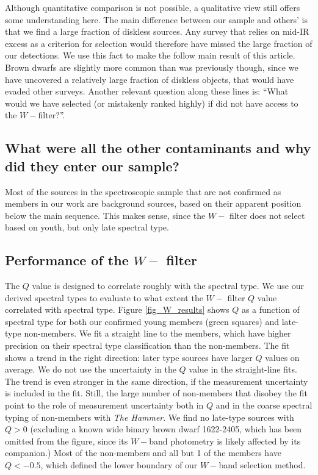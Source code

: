 \documentclass[12pt,preprint]{aastex}
\begin{document}
Although quantitative comparison is not possible, a qualitative view still offers some understanding here.  The main difference between our sample and others' is that we find a large fraction of diskless sources.  Any survey that relies on mid-IR excess as a criterion for selection would therefore have missed the large fraction of our detections.  We use this fact to make the follow main result of this article.  Brown dwarfs are slightly more common than was previously though, since we have uncovered a relatively large fraction of diskless objects, that would have evaded other surveys.  Another relevant question along these lines is: ``What would we have selected (or mistakenly ranked highly) if did not have access to the  $W-$filter?''.


\subsection{What were all the other contaminants and why did they enter our sample?}
Most of the sources in the spectroscopic sample that are not confirmed as members in our work are background sources, based on their apparent position below the main sequence.  This makes sense, since the $W-$ filter does not select based on youth, but only late spectral type.

\subsection{Performance of the $W-$ filter}

The $Q$ value is designed to correlate roughly with the spectral type.  We use our derived spectral types to evaluate to what extent the $W-$ filter $Q$ value correlated with spectral type.  Figure \ref{fig_W_results} shows $Q$ as a function of spectral type for both our confirmed young members (green squares) and late-type non-members.  We fit a straight line to the members, which have higher precision on their spectral type classification than the non-members.  The fit shows a trend in the right direction: later type sources have larger $Q$ values on average.  We do not use the uncertainty in the $Q$ value in the straight-line fits.  The trend is even stronger in the same direction, if the measurement uncertainty is included in the fit.  Still, the large number of non-members that disobey the fit point to the role of measurement uncertainty both in $Q$ and in the coarse spectral typing of non-members with \emph{The Hammer}.  We find no late-type sources with $Q>0$ (excluding a known wide binary brown dwarf 1622-2405, which has been omitted from the figure, since its $W-$band photometry is likely affected by its companion.)  Most of the non-members and all but 1 of the members have $Q<-0.5$, which defined the lower boundary of our $W-$band selection method.  
\end{document}
